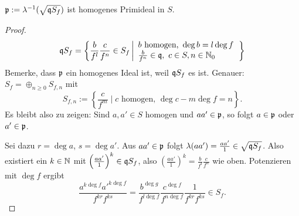 \begin{hilfslemma}
	$\mathfrak{p} := \lambda^{-1}(\sqrt{\mathfrak{q} S_f})$ ist homogenes Primideal in $S$.
\end{hilfslemma}
\begin{proof}
	\[
		\mathfrak{q} S_f = \left\{ \frac{b}{f^l} \frac{c}{f^n} \in S_f \left|
			\begin{array}{l}
				b\text{ homogen, } \deg b = l\deg f\\
				\frac{b}{f^n} \in \mathfrak{q},\ c\in S,n\in \mathbb{N}_0
			\end{array}\right. \right\}
	\]
	Bemerke, dass $\mathfrak{p}$ ein homogenes Ideal ist, weil $\mathfrak{q} S_f$ es ist.
	Genauer:
	$S_f = \oplus_{n\geq 0} S_{f,n}$ mit
	\[
		S_{f,n} := \left\{\frac{c}{f^m} \mid c\text{ homogen, }
			\deg c - m\deg f = n\right\}.
	\]
	Es bleibt also zu zeigen: Sind $a,a' \in S$ homogen und 
	$aa' \in \mathfrak{p}$, so folgt $a\in \mathfrak{p}$ oder $a'\in \mathfrak{p}$.
	
	Sei dazu  $r = \deg a$, $s = \deg a'$.
	Aus $aa'\in \mathfrak{p}$ folgt $\lambda(aa') = \frac{aa'}{1} \in \sqrt{\mathfrak{q} S_f}$.
	Also existiert ein $k\in \mathbb{N}$ mit
	$\left(\frac{aa'}{1}\right)^k \in \mathfrak{q} S_f$, also
	$\left( \frac{aa'}{1}\right)^k = \frac{b}{f^l} \frac{c}{f^n}$
	wie oben. Potenzieren mit $\deg f$ ergibt
	\[
		\frac{a^{k\deg f} a'^{k\deg f}}{f^{kr} f^{ks}} = 
		\frac{b^{\deg g}}{f^{l\deg f}} \frac{c^{\deg f}}{f^{n\deg f}}
		\frac{1}{f^{kr} f^{ks}} \in S_f.
	\]
	\TODO
\end{proof}


